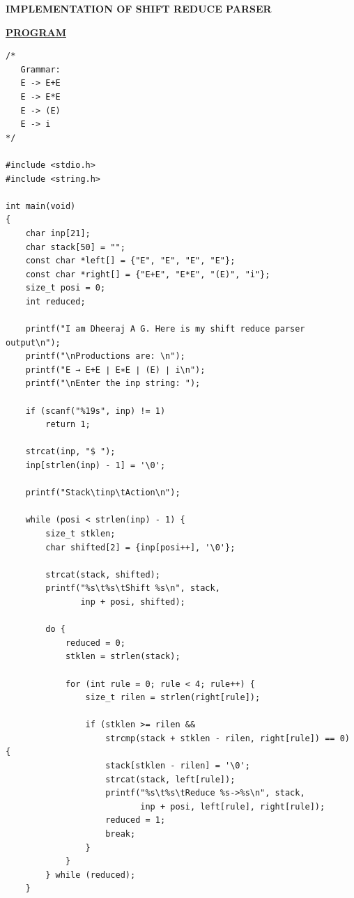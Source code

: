 \documentclass[10pt]{article}
\begin{document}
\vspace{0.05cm}

\begin{center}
    \textbf{IMPLEMENTATION OF SHIFT REDUCE PARSER}
\end{center}

\vspace{0.05cm}

\noindent
\makebox[\textwidth]{\dotfill}

\vspace{0.15cm}

\noindent
\underline{\textbf{PROGRAM}}

\vspace{0.1cm}

\begin{lstlisting}
/*
   Grammar:
   E -> E+E
   E -> E*E
   E -> (E)
   E -> i
*/

#include <stdio.h>
#include <string.h>

int main(void)
{
    char inp[21];
    char stack[50] = "";
    const char *left[] = {"E", "E", "E", "E"};
    const char *right[] = {"E+E", "E*E", "(E)", "i"};
    size_t posi = 0;
    int reduced;

    printf("I am Dheeraj A G. Here is my shift reduce parser output\n");
    printf("\nProductions are: \n");
    printf("E → E+E ∣ E∗E ∣ (E) ∣ i\n");
    printf("\nEnter the inp string: ");

    if (scanf("%19s", inp) != 1)
        return 1;

    strcat(inp, "$ ");
    inp[strlen(inp) - 1] = '\0';

    printf("Stack\tinp\tAction\n");

    while (posi < strlen(inp) - 1) {
        size_t stklen;
        char shifted[2] = {inp[posi++], '\0'};

        strcat(stack, shifted);
        printf("%s\t%s\tShift %s\n", stack,
               inp + posi, shifted);

        do {
            reduced = 0;
            stklen = strlen(stack);

            for (int rule = 0; rule < 4; rule++) {
                size_t rilen = strlen(right[rule]);

                if (stklen >= rilen &&
                    strcmp(stack + stklen - rilen, right[rule]) == 0) {
                    stack[stklen - rilen] = '\0';
                    strcat(stack, left[rule]);
                    printf("%s\t%s\tReduce %s->%s\n", stack,
                           inp + posi, left[rule], right[rule]);
                    reduced = 1;
                    break;
                }
            }
        } while (reduced);
    }


\end{lstlisting}
\end{document}
